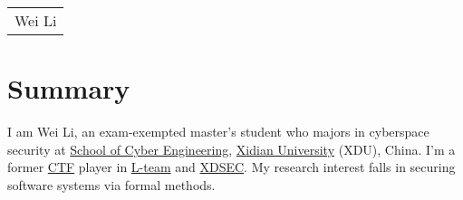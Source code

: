 \documentclass[a4paper,12pt]{article}
\begin{document}
\pagestyle{empty} 



\begin{tabularx}{\linewidth}{@{} C @{}}
\Huge{Wei Li} \\[7.5pt]
\end{tabularx}


\section{Summary}
I am Wei Li, an exam-exempted master’s student who majors in cyberspace security at \href{https://ceen.xidian.edu.cn/}{School of Cyber Engineering}, \href{https://en.xidian.edu.cn/}{Xidian University} (XDU), China. I’m a former \href{https://en.wikipedia.org/wiki/Capture_the_flag_(cybersecurity)}{CTF} player in \href{https://l.xdsec.org/}{L-team} and \href{https://xdsec.org/}{XDSEC}. My research interest falls in securing software systems via formal methods.
\end{document}
